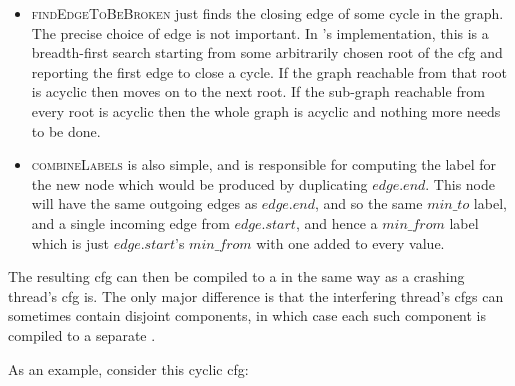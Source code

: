 \begin{itemize}
\item \textsc{findEdgeToBeBroken} just finds the closing edge of some
  cycle in the graph.  The precise choice of edge is not
  important.  In {\implementation}'s implementation, this is a
  breadth-first search starting from some arbitrarily chosen root of
  the \gls{cfg} and reporting the first edge to close a cycle.  If the graph
  reachable from that root is acyclic then {\implementation} moves on
  to the next root.  If the sub-graph reachable from every root is
  acyclic then the whole graph is acyclic and nothing more needs to be
  done.
\item \textsc{combineLabels} is also simple, and is responsible for
  computing the label for the new node which would be produced by
  duplicating $\mathit{edge}.\mathit{end}$.  This node will have the
  same outgoing edges as $\mathit{edge}.\mathit{end}$, and so the same
  $min\_to$ label, and a single incoming edge from
  $\mathit{edge}.\mathit{start}$, and hence a $\mathit{min\_from}$
  label which is just $\mathit{edge}.\mathit{start}$'s
  $\mathit{min\_from}$ with one added to every value.
\end{itemize}

The resulting \gls{cfg} can then be compiled to a {\StateMachine} in the
same way as a crashing thread's \gls{cfg} is.  The only major difference is
that the interfering thread's \glspl{cfg} can sometimes contain disjoint
components, in which case each such component is compiled to a
separate {\StateMachine}.

As an example, consider this cyclic \gls{cfg}:



